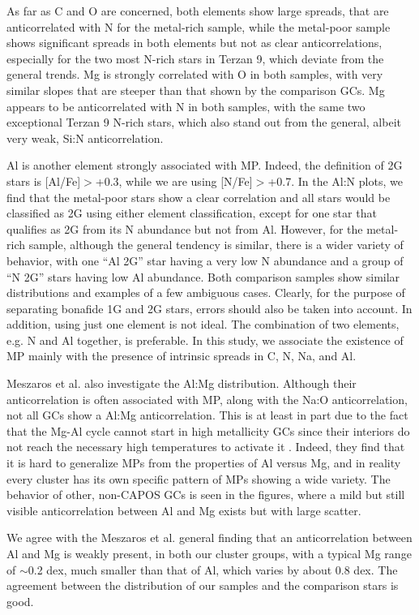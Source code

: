 \documentclass[onecolumn]{aa}
\begin{document}
As far as C and O are concerned, both elements show large spreads, that are anticorrelated with N for the metal-rich sample, while the metal-poor sample shows significant spreads in both elements but not as clear anticorrelations, especially for the two most N-rich stars in Terzan 9, which deviate from the general trends. Mg is strongly correlated with O in both samples, with very similar slopes that are steeper than that shown by the comparison GCs.  Mg appears to be  anticorrelated with N in both samples, with the same two exceptional Terzan 9 N-rich stars, which also stand out from the general, albeit very weak, Si:N anticorrelation.

Al is another element strongly associated with MP. Indeed, the \citet{Meszaros2020} definition of 2G stars is [Al/Fe]$>$+0.3, while we are using [N/Fe]$>$+0.7. In the Al:N plots, we find that the metal-poor stars show a clear correlation and all stars would be classified as 2G using either element classification, except for one star that qualifies as 2G from its N abundance but not from Al. 
However, for the metal-rich sample, although the general tendency is similar, there is a wider variety of behavior, with one ``Al 2G'' star having a very low N abundance and a group of ``N 2G'' stars having low Al abundance. Both comparison samples show similar distributions and examples of a few ambiguous cases.
Clearly, for the purpose of separating bonafide 1G and 2G stars, errors should also be taken into account. In addition, using just one element is not ideal. The combination of two elements, e.g. N and Al together, is preferable.
In this study, we associate the existence of MP mainly with the presence of  intrinsic spreads in C, N, Na, and Al.

Meszaros et al. also investigate the Al:Mg distribution. Although their anticorrelation is often associated with MP, along with the Na:O anticorrelation, not all GCs show a Al:Mg anticorrelation. This is at least in part due to the fact that the Mg-Al cycle cannot start in high metallicity GCs since their interiors do not reach the necessary high temperatures to activate it \citep{Meszaros2020}. Indeed, they find that it is hard to generalize MPs from the properties of Al versus Mg, and in reality every cluster has its own specific pattern of MPs showing a wide variety. The behavior of other, non-CAPOS GCs is seen in the figures, where a mild but still visible anticorrelation between Al and Mg exists but with large scatter.

We agree with the Meszaros et al. general finding that an anticorrelation between Al and Mg is weakly present, in both our cluster groups, with a typical Mg range of $\sim$0.2 dex, much smaller than that of Al, which varies by about 0.8 dex. The agreement between the distribution of our samples and the comparison stars is good.
\end{document}
